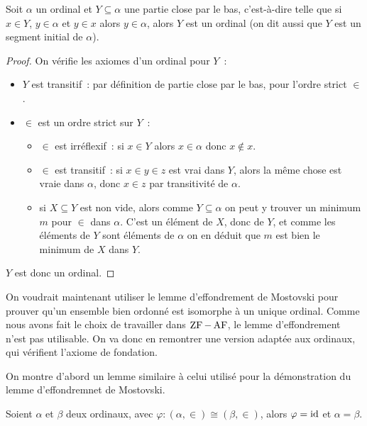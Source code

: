 \begin{proposition}
  Soit $\alpha$ un ordinal et $Y\subseteq \alpha$ une partie close par le bas,
  c'est-à-dire telle que si $x\in Y$, $y\in \alpha$ et $y\in x$ alors
  $y\in \alpha$, alors $Y$ est un ordinal (on dit aussi que $Y$ est un segment
  initial de $\alpha$).
\end{proposition}

\begin{proof}
  On vérifie les axiomes d'un ordinal pour $Y$~:
  \begin{itemize}
  \item $Y$ est transitif~: par définition de partie close par le bas, pour
    l'ordre strict $\in$.
  \item $\in$ est un ordre strict sur $Y$~:
    \begin{itemize}
    \item $\in$ est irréflexif~: si $x \in Y$ alors $x \in \alpha$ donc
      $x\notin x$.
    \item $\in$ est transitif~: si $x\in y \in z$ est vrai dans $Y$, alors
      la même chose est vraie dans $\alpha$, donc $x \in z$ par transitivité de
      $\alpha$.
    \item si $X\subseteq Y$ est non vide, alors comme $Y\subseteq \alpha$ on
      peut y trouver un minimum $m$ pour $\in$ dans $\alpha$. C'est un élément
      de $X$, donc de $Y$, et comme les éléments de $Y$ sont éléments de
      $\alpha$ on en déduit que $m$ est bien le minimum de $X$ dans $Y$.
    \end{itemize}
  \end{itemize}
  $Y$ est donc un ordinal.
\end{proof}

On voudrait maintenant utiliser le lemme d'effondrement de Mostovski pour
prouver qu'un ensemble bien ordonné est isomorphe à un unique ordinal. Comme
nous avons fait le choix de travailler dans $\operatorname{ZF} - \operatorname{AF}$, le lemme
d'effondrement n'est pas utilisable. On va donc en remontrer une version adaptée
aux ordinaux, qui vérifient l'axiome de fondation.

On montre d'abord un lemme similaire à celui utilisé pour la démonstration du
lemme d'effondremnet de Mostovski.

\begin{lemma}
  Soient $\alpha$ et $\beta$ deux ordinaux, avec
  $\varphi : (\alpha,\in) \cong (\beta,\in)$, alors $\varphi = \operatorname{id}$ et
  $\alpha = \beta$.
\end{lemma}

